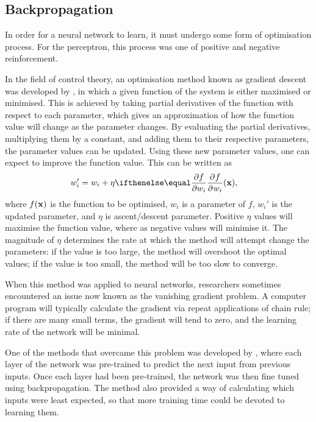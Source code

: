 


\subsection{Backpropagation}

In order for a neural network to learn, it must undergo some form of
optimisation process.
For the perceptron, this process was one of positive and negative reinforcement.



In the field of control theory, an optimisation method known as gradient descent
was developed by \cite{Kelley:1960:Gradient}, in which a given function of the
system is either maximised or minimised.
This is achieved by taking partial derivatives of the function with respect to
each parameter, which gives an approximation of how the function value will
change as the parameter changes.
By evaluating the partial derivatives, multiplying them by a constant, and
adding them to their respective parameters, the parameter values can be updated.
Using these new parameter values, one can expect to improve the function value.
This can be written as
\begin{align*}
    w_i' &= w_i + \eta\Rpdiff{f}{w_i}(\Rvec{x}),
\end{align*}
where $f(\mathbf{x})$ is the function to be optimised, $w_i$ is a parameter of
$f$, $w_i'$ is the updated parameter, and $\eta$ is ascent/descent parameter.
Positive $\eta$ values will maximise the function value, where as negative
values will minimise it.
The magnitude of $\eta$ determines the rate at which the method will attempt
change the parameters: if the value is too large, the method will overshoot the
optimal values; if the value is too small, the method will be too slow to
converge.

When this method was applied to neural networks, researchers sometimes
encountered an issue now known as the vanishing gradient problem.
A computer program will typically calculate the gradient via repeat applications
of chain rule; if there are many small terms, the gradient will tend to zero,
and the learning rate of the network will be minimal.



One of the methods that overcame this problem was developed by
\cite{Schmidhuber:1992:Compression}, where each layer of the network was
pre-trained to predict the next input from previous inputs.
Once each layer had been pre-trained, the network was then fine tuned using
backpropagation.
The method also provided a way of calculating which inputs were least expected,
so that more training time could be devoted to learning them.

